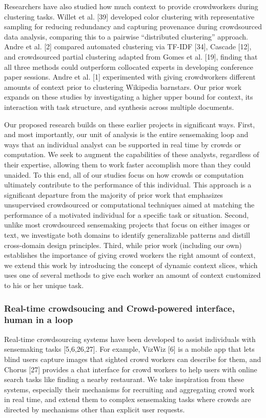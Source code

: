 \documentclass[journal]{vgtc}                %
\begin{document}
Researchers have also studied how much context to provide crowdworkers during clustering tasks. Willet et al. [39] developed color clustering with representative sampling for reducing redundancy and capturing provenance during crowdsourced data analysis, comparing this to a pairwise “distributed clustering” approach. Andre et al. [2] compared automated clustering via TF-IDF [34], Cascade [12], and crowdsourced partial clustering adapted from Gomes et al. [19], finding that all three methods could outperform collocated experts in developing conference paper sessions. Andre et al. [1] experimented with giving crowdworkers different amounts of context prior to clustering Wikipedia barnstars. Our prior work expands on these studies by investigating a higher upper bound for context, its interaction with task structure, and synthesis across multiple documents.

Our proposed research builds on these earlier projects in significant ways. First, and most importantly, our unit of analysis is the entire sensemaking loop and ways that an individual analyst can be supported in real time by crowds or computation. We seek to augment the capabilities of these analysts, regardless of their expertise, allowing them to work faster accomplish more than they could unaided. To this end, all of our studies focus on how crowds or computation ultimately contribute to the performance of this individual. This approach is a significant departure from the majority of prior work that emphasizes unsupervised crowdsourced or computational techniques aimed at matching the performance of a motivated individual for a specific task or situation. Second, unlike most crowdsourced sensemaking projects that focus on either images or text, we investigate both domains to identify generalizable patterns and distill cross-domain design principles. Third, while prior work (including our own) establishes the importance of giving crowd workers the right amount of context, we extend this work by introducing the concept of dynamic context slices, which uses one of several methods to give each worker an amount of context customized to his or her unique task.

\subsubsection{Real-time crowdsoucing and Crowd-powered interface, human in a loop}
Real-time crowdsourcing systems have been developed to assist individuals with sensemaking tasks [5,6,26,27]. For example, VizWiz [6] is a mobile app that lets blind users capture images that sighted crowd workers can describe for them, and Chorus [27] provides a chat interface for crowd workers to help users with online search tasks like finding a nearby restaurant. We take inspiration from these systems, especially their mechanisms for recruiting and aggregating crowd work in real time, and extend them to complex sensemaking tasks where crowds are directed by mechanisms other than explicit user requests.
\end{document}
